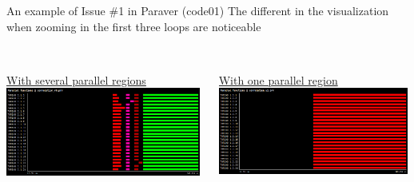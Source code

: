\documentclass[10pt,xcolor=table]{beamer}
\begin{document}
\begin{frame}{An example of Issue \#1 in Paraver (code01)}
The different in the visualization when zooming in the first three loops are noticeable
\centering
\begin{columns}
\begin{column}{0.5\textwidth}
\\\underline{With several parallel regions}
\includegraphics[width=0.99\textwidth]{figs/Parallel_functions@correlation_v0.png}
 \end{column}
 \begin{column}{0.5\textwidth}
 \\\underline{With one parallel region}
\includegraphics[width=0.99\textwidth]{figs/Parallel_functions@correlation_v1.png}
 \end{column}
\end{columns}
\end{frame}
\end{document}

